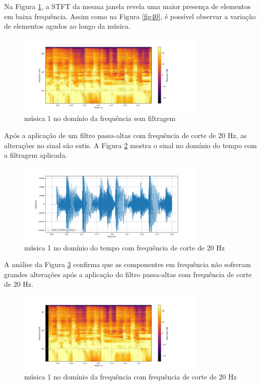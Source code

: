 Na Figura \ref{fig41}, a STFT da mesma janela revela uma maior presença de elementos em baixa frequência. Assim como na Figura \ref{fig40}, é possível observar a variação de elementos agudos ao longo da música.

\begin{figure}[h]
    \centering
    \includegraphics[width=0.8\textwidth]{figuras/fig41.png}
    \caption{música 1 no domínio da frequência sem filtragem}
    \label{fig41}
\end{figure}

Após a aplicação de um filtro passa-altas com frequência de corte de 20 Hz, as alterações no sinal são sutis. A Figura \ref{fig24} mostra o sinal no domínio do tempo com a filtragem aplicada.

\begin{figure}[h]
    \centering
    \includegraphics[width=0.8\textwidth]{figuras/fig24.png}
    \caption{música 1 no domínio do tempo com frequência de corte de 20 Hz}
    \label{fig24}
\end{figure}

A análise da Figura \ref{fig25} confirma que as componentes em frequência não sofreram grandes alterações após a aplicação do filtro passa-altas com frequência de corte de 20 Hz.

\begin{figure}[h]
    \centering
    \includegraphics[width=0.8\textwidth]{figuras/fig25.png}
    \caption{música 1 no domínio da frequência com frequência de corte de 20 Hz}
    \label{fig25}
\end{figure}



